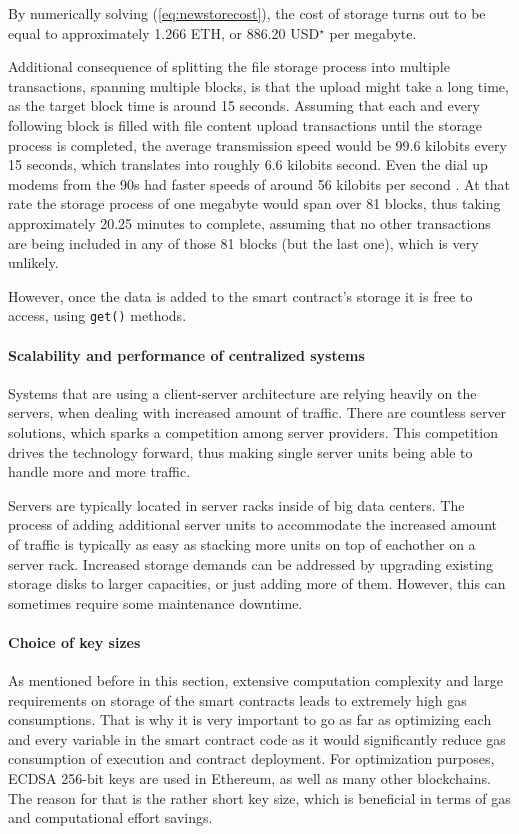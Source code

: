By numerically solving (\ref{eq:newstorecost}), the cost of storage turns out to be equal to approximately 1.266 ETH, or 886.20 USD$^\star$ per megabyte.

Additional consequence of splitting the file storage process into multiple transactions, spanning multiple blocks, is that the upload might take a long time, as the target block time is around 15 seconds. Assuming that each and every following block is filled with file content upload transactions until the storage process is completed, the average transmission speed would be 99.6 kilobits every 15 seconds, which translates into roughly 6.6 kilobits second. Even the dial up modems from the 90s had faster speeds of around 56 kilobits per second \citep{dialup}. At that rate the storage process of one megabyte would span over 81 blocks, thus taking approximately 20.25 minutes to complete, assuming that no other transactions are being included in any of those 81 blocks (but the last one), which is very unlikely.

However, once the data is added to the smart contract's storage it is free to access, using \texttt{get()} methods.

\paragraph{Scalability and performance of centralized systems}
Systems that are using a client-server architecture are relying heavily on the servers, when dealing with increased amount of traffic. There are countless server solutions, which sparks a competition among server providers. This competition drives the technology forward, thus making single server units being able to handle more and more traffic.

Servers are typically located in server racks inside of big data centers. The process of adding additional server units to accommodate the increased amount of traffic is typically as easy as stacking more units on top of eachother on a server rack. Increased storage demands can be addressed by upgrading existing storage disks to larger capacities, or just adding more of them. However, this can sometimes require some maintenance downtime.

\paragraph{Choice of key sizes}
As mentioned before in this section, extensive computation complexity and large requirements on storage of the smart contracts leads to extremely high gas consumptions. That is why it is very important to go as far as optimizing each and every variable in the smart contract code as it would significantly reduce gas consumption of execution and contract deployment. For optimization purposes, ECDSA 256-bit keys are used in Ethereum, as well as many other blockchains. The reason for that is the rather short key size, which is beneficial in terms of gas and computational effort savings.

